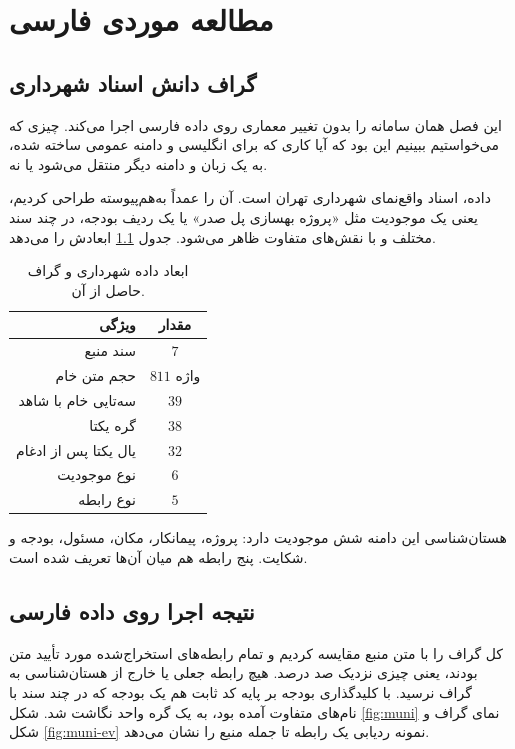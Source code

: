 \chapter{مطالعه موردی فارسی}
\label{ch:casestudy}

\section{گراف دانش اسناد شهرداری}
\label{sec:municipality}

این فصل همان سامانه را بدون تغییر معماری روی داده فارسی اجرا می‌کند. چیزی که می‌خواستیم ببینیم این بود که آیا کاری که برای انگلیسی و دامنه عمومی ساخته شده، به یک زبان و دامنه دیگر منتقل می‌شود یا نه.

داده، اسناد واقع‌نمای شهرداری تهران است. آن را عمداً به‌هم‌پیوسته طراحی کردیم، یعنی یک موجودیت مثل «پروژه بهسازی پل صدر» یا یک ردیف بودجه، در چند سند مختلف و با نقش‌های متفاوت ظاهر می‌شود. جدول \ref{tab:muni} ابعادش را می‌دهد.

\begin{table}[ht]
\centering
\caption{ابعاد داده شهرداری و گراف حاصل از آن.}
\label{tab:muni}
\small
\begin{tabular}{|r|c|}
\hline
ویژگی & مقدار \\
\hline
سند منبع & $7$ \\
\hline
حجم متن خام & $811$ واژه \\
\hline
سه‌تایی خام با شاهد & $39$ \\
\hline
گره یکتا & $38$ \\
\hline
یال یکتا پس از ادغام & $32$ \\
\hline
نوع موجودیت & $6$ \\
\hline
نوع رابطه & $5$ \\
\hline
\end{tabular}
\end{table}

هستان‌شناسی این دامنه شش موجودیت دارد: پروژه، پیمانکار، مکان، مسئول، بودجه و شکایت. پنج رابطه هم میان آن‌ها تعریف شده است.

\section{نتیجه اجرا روی داده فارسی}
\label{sec:muni-result}

کل گراف را با متن منبع مقایسه کردیم و تمام رابطه‌های استخراج‌شده مورد تأیید متن بودند، یعنی چیزی نزدیک صد درصد. هیچ رابطه جعلی یا خارج از هستان‌شناسی به گراف نرسید. با کلیدگذاری بودجه بر پایه کد ثابت هم یک بودجه که در چند سند با نام‌های متفاوت آمده بود، به یک گره واحد نگاشت شد. شکل \ref{fig:muni} نمای گراف و شکل \ref{fig:muni-ev} نمونه ردیابی یک رابطه تا جمله منبع را نشان می‌دهد.

